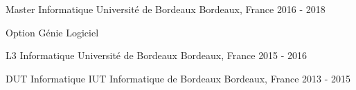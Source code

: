 \begin{cventries}
    \cventry
    {Master Informatique}
    {Université de Bordeaux}
    {Bordeaux, France}
    {2016 - 2018}
    {
      \begin{cvitems}
        \item {Option Génie Logiciel}
      \end{cvitems}
    }

    \cventry
    {L3 Informatique}
    {Université de Bordeaux}
    {Bordeaux, France}
    {2015 - 2016}
    {}

    \cventry
    {DUT Informatique}
    {IUT Informatique de Bordeaux}
    {Bordeaux, France}
    {2013 - 2015}
    {}
\end{cventries}